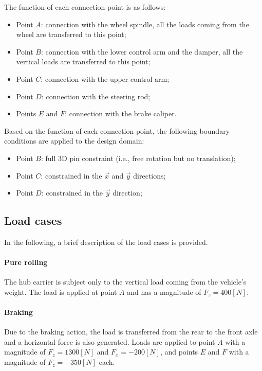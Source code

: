 The function of each connection point is as follows:

\begin{itemize}
    \item Point $A$: connection with the wheel spindle, all the loads coming from the wheel are transferred to this point;
    \item Point $B$: connection with the lower control arm and the damper, all the vertical loads are transferred to this point;
    \item Point $C$: connection with the upper control arm;
    \item Point $D$: connection with the steering rod;
    \item Points $E$ and $F$: connection with the brake caliper.
\end{itemize}

Based on the function of each connection point, the following boundary conditions are applied to the design domain:

\begin{itemize}
    \item Point $B$: full 3D pin constraint (i.e., free rotation but no translation);
    \item Point $C$: constrained in the $\vec{x}$ and $\vec{y}$ directions;
    \item Point $D$: constrained in the $\vec{y}$ direction;
\end{itemize}


\subsection{Load cases}
\label{subsec:load_cases}

In the following, a brief description of the load cases is provided.

\paragraph{Pure rolling}
The hub carrier is subject only to the vertical load coming from the vehicle's weight. The load is applied at point $A$ and has a magnitude of $F_z = 400 [N]$.

\paragraph{Braking}
Due to the braking action, the load is transferred from the rear to the front axle and a horizontal force is also generated.
Loads are applied to point $A$ with a magnitude of $F_z = 1300 [N]$ and $F_x = -200 [N]$, and points $E$ and $F$ with a magnitude of $F_z = -350 [N]$ each.

